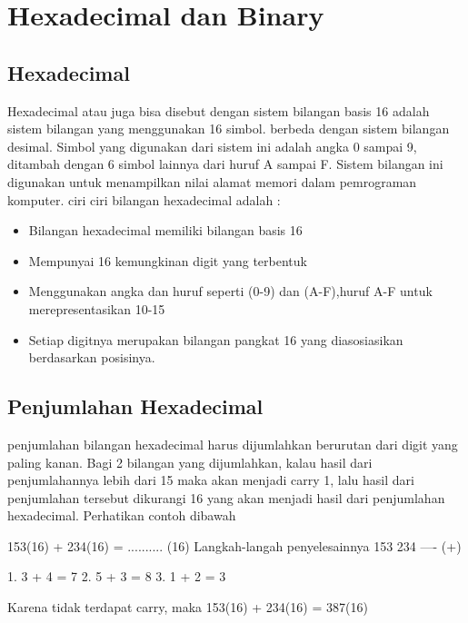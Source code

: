 \section {Hexadecimal dan Binary}
\subsection {Hexadecimal}
Hexadecimal atau juga bisa disebut dengan sistem bilangan basis 16 adalah sistem bilangan yang menggunakan 16 simbol. berbeda dengan sistem bilangan desimal. Simbol yang digunakan dari sistem ini adalah angka 0 sampai 9, ditambah dengan 6 simbol lainnya dari huruf A sampai F. Sistem bilangan ini digunakan untuk menampilkan nilai alamat memori dalam pemrograman komputer.
ciri ciri bilangan hexadecimal adalah :
\begin{itemize}
	\item Bilangan hexadecimal memiliki bilangan basis 16
	\item Mempunyai 16 kemungkinan digit yang terbentuk
	\item Menggunakan angka dan huruf seperti (0-9) dan (A-F),huruf A-F untuk merepresentasikan 10-15
	\item Setiap digitnya merupakan bilangan pangkat 16 yang diasosiasikan berdasarkan posisinya.
\end{itemize}

\subsection {Penjumlahan Hexadecimal}
penjumlahan bilangan hexadecimal harus dijumlahkan berurutan dari digit yang paling kanan. Bagi 2 bilangan yang dijumlahkan, kalau hasil dari penjumlahannya lebih dari 15 maka akan menjadi carry 1, lalu hasil dari penjumlahan tersebut dikurangi 16 yang akan menjadi hasil dari penjumlahan hexadecimal. Perhatikan contoh dibawah

153(16) + 234(16) = .......... (16) 
Langkah-langah penyelesainnya
153 
234 
---- (+)

1. 3 + 4 = 7
2. 5 + 3 = 8
3. 1 + 2 = 3

Karena tidak terdapat carry, maka 153(16) + 234(16) = 387(16)


